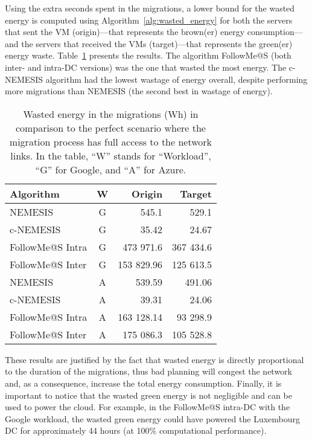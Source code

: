 Using the extra seconds spent in the migrations, a lower bound for the wasted energy is computed using Algorithm~\ref{alg:wasted_energy} for both the servers that sent the VM (origin)---that represents the brown(er) energy consumption---and the servers that received the VMs (target)---that represents the green(er) energy waste. Table~\ref{tab:wasted_mig} presents the results.  The algorithm FollowMe@S (both inter- and intra-DC versions) was the one that wasted the most energy. The c-NEMESIS algorithm had the lowest wastage of energy overall, despite performing more migrations than NEMESIS (the second best in wastage of energy). 



\begin{table}[h]

\caption{Wasted energy in the migrations (Wh) in comparison to the perfect scenario where the migration process has full access to the network links. In the table, ``W'' stands for ``Workload'', ``G'' for Google, and ``A'' for Azure.}\label{tab:wasted_mig} \centering
\begin{tabular}{|l|c|r|r|}
  \hline
  \textbf{Algorithm} & \textbf{W}  & \textbf{Origin} & \textbf{Target}   \\
  \hline
  NEMESIS  & G & 545.1  & 529.1 \\
  \hline
  c-NEMESIS & G & 35.42  & 24.67 \\
  \hline
  FollowMe@S Intra & G & 473 971.6 & 367 434.6 \\
  \hline
  FollowMe@S Inter & G & 153 829.96  & 125 613.5  \\
  \hline
  NEMESIS  & A & 539.59  & 491.06 \\
  \hline
  c-NEMESIS & A &  39.31 & 24.06   \\
  \hline
  FollowMe@S Intra & A & 163 128.14  & 93 298.9  \\
  \hline
  FollowMe@S Inter & A & 175 086.3  & 105 528.8 \\
  \hline

\end{tabular}
\end{table}



These results are justified by the fact that wasted energy is directly proportional to the duration of the migrations, thus bad planning will congest the network and, as a consequence, increase the total energy consumption. Finally, it is important to notice that the wasted green energy is not negligible and can be used to power the cloud. For example, in the FollowMe@S intra-DC with the Google workload, the wasted green energy could have powered the Luxembourg DC for approximately 44 hours (at 100\% computational performance).


